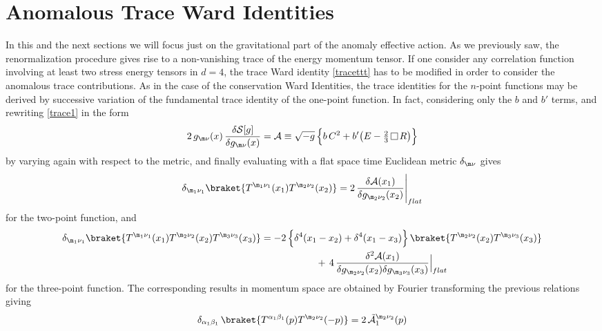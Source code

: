 \documentclass[a4paper,11pt,openright,twoside]{book}
\let\a=\alpha   \let\b=\beta   \let\g=\gamma   \let\d=\delta
\let\n=\nu      \let\x=\xi     \let\p=\pi      \let\r=\rho
\def\nbox#1#2{\vcenter{\hrule \hbox{\vrule height#2in
			\kern#1in \vrule} \hrule}}
\def\sq{\,\raise.5pt\hbox{$\nbox{.09}{.09}$}\,}
\numberwithin{equation}{section}
\begin{document}
{{{\section{Anomalous Trace Ward Identities}
\label{Sec:TraceWI}
{
	In this and the next sections we will focus just on the gravitational part of the anomaly effective action. As we previously saw, the renormalization procedure gives rise to a non-vanishing trace of the energy momentum tensor. If one consider any correlation function involving at least two stress energy tensors in $d=4$, the trace Ward identity \eqref{tracettt} has to be modified in order to consider the anomalous trace contributions. As in the case of the conservation Ward Identities, the trace identities for the $n$-point functions may be derived by successive
	variation of the fundamental trace identity of the one-point function. In fact, considering only the $b$ and $b'$ terms, and rewriting \eqref{trace1} in the form
	\begin{equation}
		2\, g_{\m\n}(x)\,\frac{\d \mathcal{S}[g]}{\d g_{\m\n}(x)} =\mathcal{A} \equiv \sqrt{-g}\, \Big\{ b\, C^2 + b' \big(E - \tfrac{2}{3}\sq R\big) \Big\}
		\label{Adef}
	\end{equation}
	by varying again with respect to the metric, and finally evaluating with a flat space time Euclidean metric $\delta_{\m\n}$ gives
	\begin{equation}
		\delta_{\m_1\n_1}\braket{T^{\m_1\n_1}(x_1)T^{\m_2\n_2}(x_2)} = 2\, \frac{\d \mathcal{A}(x_1)}{\d g_{\m_2\n_2}(x_2)}\Bigg\vert_{flat}
		\label{twoptrace}
	\end{equation}
	for the two-point function, and 
	\begin{align}
		\delta_{\m_1\n_1}\braket{T^{\m_1\n_1}(x_1)T^{\m_2\n_2}(x_2)T^{\m_3\n_3}(x_3)}&=
		- 2\,\Big\{\d^4 (x_1-x_2) + \d^4(x_1-x_3)\Big\}\, \braket{T^{\m_2\n_2}(x_2)T^{\m_3\n_3}(x_3)} \notag\\
		&\hspace{2cm}+ \, 4 \, \frac{\d^2\mathcal{A}(x_1)}{\d g_{\m_2\n_2}(x_2)\d g_{\m_3\n_3}(x_3)}\Big|_{flat}
		\label{threeptrace}
	\end{align}
	for the three-point function. The corresponding results in momentum space are obtained by Fourier transforming the previous relations giving
	\begin{equation}
		\delta_{\a_1\b_1} \, \braket{T^{\a_1\b_1}(p)T^{\m_2\n_2}( -p)} =  2\, \tilde{\mathcal{A}}_1^{\m_2\n_2} (p)
		\label{twoptr}
	\end{equation}
}}}}
\end{document}
